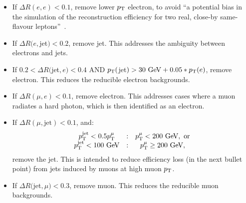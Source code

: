 \begin{itemize}
	\item If $\Delta R(e, e) < 0.1$, remove lower $p_{\text{T}}$ electron, to avoid ``a potential bias in the simulation of the reconstruction efficiency for two real, close-by same-flavour leptons''~\cite{Adams:1700874}.
	\item If $\Delta R(e, $jet$) < 0.2$, remove jet. This addresses the ambiguity between electrons and jets.
	\item If $0.2 < \Delta R($jet$, e) < 0.4$ AND $p_{\text{T}}($jet$) > 30~\mbox{GeV} + 0.05 * p_{\text{T}}(e)$, remove electron. This reduces the reducible electron backgrounds.
	\item If $\Delta R(\mu, e) < 0.1$, remove electron. This addresses cases where a muon radiates a hard photon, which is then identified as an electron.
	\item If $\Delta R(\mu, \mbox{jet})<0.1$, and:
	\begin{equation}
		\begin{array}{ccc}
			p_{\text{T}}^{\mathrm{jet}}<0.5 p_{\text{T}}^{\mu} & : & p_{\text{T}}^{\mu} < 200~\mbox{GeV},\ \mbox{or} \\
			p_{\text{T}}^{\mathrm{jet}}<100~\mbox{GeV} & : & p_{\text{T}}^{\mu} \geq 200~\mbox{GeV},
		\end{array}
	\end{equation}
	remove the jet. This is intended to reduce efficiency loss (in the next bullet point) from jets induced by muons at high muon $p_{\text{T}}$. 
	\item If $\Delta R($jet$, \mu) < 0.3$, remove muon. This reduces the reducible muon backgrounds.
\end{itemize}

%
%
%
%

